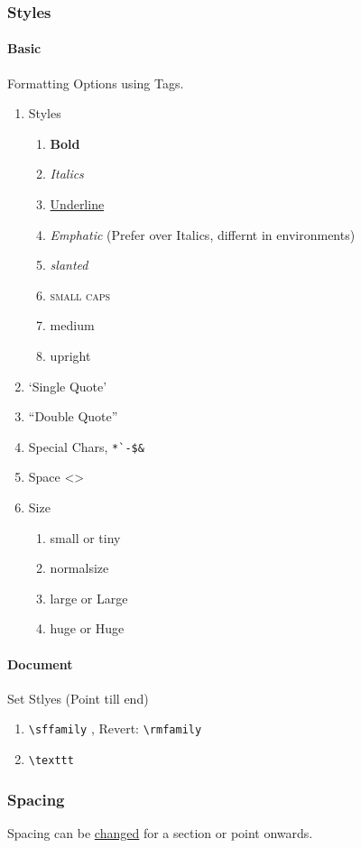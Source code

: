 \documentclass{report}[a4paper,12pt] %
\begin{document}
\subsubsection{Styles}
\paragraph{Basic} Formatting Options using Tags.
\begin{enumerate}
  \item Styles
  \begin{enumerate}
    \item \textbf{Bold}
    \item \textit{Italics}
    \item \underline{Underline}
    \item \emph{Emphatic} (Prefer over Italics, differnt in environments)
    \item \textsl{slanted}
    \item \textsc{small caps}
    \item \textmd{medium}
    \item \textup{upright}
  \end{enumerate}
  \item `Single Quote'
  \item ``Double Quote''
  \item Special Chars, \verb|*`-$&|
  \item Space <\space>
  \item Size
  \begin{enumerate}
    \item \small small or \tiny tiny
    \item \normalsize normalsize
    \item \large large or \Large Large
    \item \huge huge or \Huge Huge
  \end{enumerate}
\end{enumerate}

\paragraph{Document} Set Stlyes (Point till end)
\begin{enumerate}
  \item \verb|\sffamily| , Revert: \verb|\rmfamily|
  \item \verb|\texttt| 
\end{enumerate}

\subsubsection{Spacing} 
Spacing can be \href{https://www.overleaf.com/learn/latex/Articles/How_to_change_paragraph_spacing_in_LaTeX}{changed} for a section or point onwards.
\end{document}

